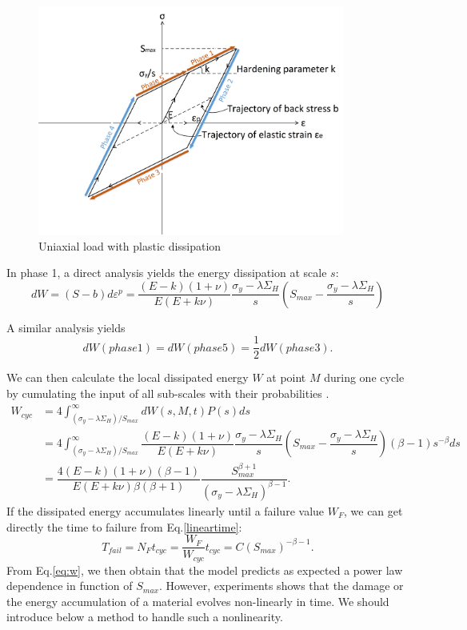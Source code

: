 \documentclass[3p,times,number,review]{elsarticle}
\begin{document}
\begin{figure}[!h]
	\centering
	\includegraphics[width=0.9\textwidth]{figures//backstress.png} 
	\caption{Uniaxial load with plastic dissipation}
	\label{backstress}
\end{figure}

In phase 1, a direct analysis yields the energy dissipation at scale $s$:
\begin{equation}dW=(S-b)d\varepsilon^p=\dfrac{(E-k)(1+\nu) }{E(E+k\nu)}\dfrac{\sigma_y-\lambda \Sigma_H}{s}\left(S_{max}-\dfrac{\sigma_y-\lambda \Sigma_H}{s}\right)
\label{dw}
\end{equation}

A similar analysis yields $$dW(phase 1)=dW(phase 5)=\dfrac{1}{2}dW(phase 3).$$

We can then calculate  the local dissipated energy $W$  at point $M$ during one cycle by cumulating the input of all sub-scales with their probabilities \cite{zepeng}.
\begin{equation}
\begin{split}
W_{cyc}&=4\int_{\left( \sigma_y-\lambda \Sigma_H\right) /S_{max}}^{\infty}dW(s,M,t)P(s)ds
\\&=4\int_{\left( \sigma_y-\lambda \Sigma_H\right) /S_{max}}^{\infty}\dfrac{(E-k)(1+\nu) }{E(E+k\nu)}\dfrac{\sigma_y-\lambda \Sigma_H}{s}\left(S_{max}-\dfrac{\sigma_y-\lambda \Sigma_H}{s}\right)\left( \beta-1\right) s^{-\beta}ds
\\&=\dfrac{4(E-k)(1+\nu)\left( \beta-1\right) }{ E(E+k\nu)\beta\left( \beta+1\right) }\dfrac{S_{max}^{\beta+1}}{\left( \sigma_y-\lambda \Sigma_H\right) ^{\beta-1}}.
\end{split}
\label{eq:w}
\end{equation}
 If the dissipated energy accumulates linearly until a failure value $W_F$, we can get directly the time to failure from Eq.\eqref{lineartime}:
\begin{equation}
T_{fail}=N_{F}t_{cyc}=\dfrac{W_F}{W_{cyc}}t_{cyc}=C(S_{max})^{-\beta-1}.
\label{lineartime}
\end{equation}
From Eq.\eqref{eq:w}, we then obtain that the model predicts as expected a power law dependence in function of $S_{max}$.
However, experiments shows that the damage or the energy accumulation of a material evolves non-linearly in time. We should introduce below a method to handle such a nonlinearity.
\end{document}
